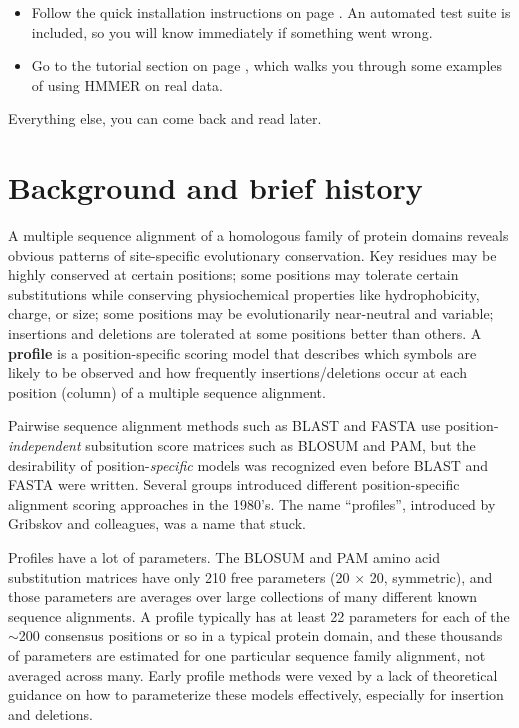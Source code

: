 \begin{itemize}

\item Follow the quick installation instructions on page
  \pageref{chapter:installation}. An automated test suite is included,
  so you will know immediately if something went
  wrong.

\item Go to the tutorial section on page \pageref{chapter:tutorial},
  which walks you through some examples of using HMMER on real data.

\end{itemize}

Everything else, you can come back and read later.



\section{Background and brief history}

A multiple sequence alignment of a homologous family of protein
domains reveals obvious patterns of site-specific evolutionary
conservation. Key residues may be highly conserved at certain
positions; some positions may tolerate certain substitutions while
conserving physiochemical properties like hydrophobicity, charge, or
size; some positions may be evolutionarily near-neutral and variable;
insertions and deletions are tolerated at some positions better than
others.  A \textbf{profile} is a position-specific scoring model that
describes which symbols are likely to be observed and how frequently
insertions/deletions occur at each position (column) of a multiple
sequence alignment.

Pairwise sequence alignment methods such as BLAST and FASTA use
position-\emph{independent} subsitution score matrices such as BLOSUM
and PAM, but the desirability of position-\emph{specific} models was
recognized even before BLAST and FASTA were written.\cite{Doolittle81}
Several groups introduced different position-specific alignment
scoring approaches in the 1980's. The name ``profiles'', introduced by
Gribskov and colleagues,\cite{Gribskov87} was a name that stuck.

Profiles have a lot of parameters.  The BLOSUM and PAM amino acid
substitution matrices have only 210 free parameters (20 $\times$ 20,
symmetric), and those parameters are averages over large collections
of many different known sequence alignments. A profile typically has
at least 22 parameters  for each of the $\sim$200 consensus positions or so in a
typical protein domain, and these thousands of parameters are
estimated for one particular sequence family alignment, not averaged
across many. Early profile methods were vexed by a lack of theoretical
guidance on how to parameterize these models effectively, especially
for insertion and deletions.

